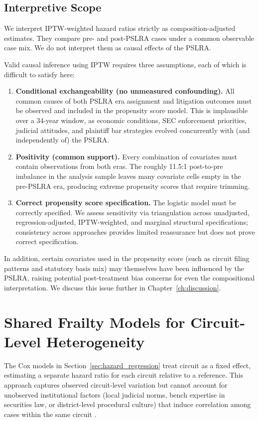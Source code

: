 \subsection{Interpretive Scope}

We interpret IPTW-weighted hazard ratios strictly as composition-adjusted estimates. They compare pre- and post-PSLRA cases under a common observable case mix. We do not interpret them as causal effects of the PSLRA.

Valid causal inference using IPTW requires three assumptions, each of which is difficult to satisfy here:
\begin{enumerate}
    \item \textbf{Conditional exchangeability (no unmeasured
    confounding).} All common causes of both PSLRA era assignment and litigation outcomes must be observed and included in the propensity score model. This is implausible over a
    34-year window, as economic conditions, SEC enforcement
    priorities, judicial attitudes, and plaintiff bar
    strategies evolved concurrently with (and independently
    of) the PSLRA.
    \item \textbf{Positivity (common support).} Every
    combination of covariates must contain observations from
    both eras. The roughly 11.5:1 post-to-pre imbalance in
    the analysis sample leaves many covariate cells empty in the pre-PSLRA era, producing extreme propensity scores that require trimming.
    \item \textbf{Correct propensity score specification.}
    The logistic model must be correctly specified. We assess
    sensitivity via triangulation across unadjusted,
    regression-adjusted, IPTW-weighted, and marginal
    structural specifications; consistency across approaches
    provides limited reassurance but does not prove correct
    specification.
\end{enumerate}
In addition, certain covariates used in the propensity score
(such as circuit filing patterns and statutory basis mix) may
themselves have been influenced by the PSLRA, raising
potential post-treatment bias concerns for even the
compositional interpretation. We discuss this issue further
in Chapter~\ref{ch:discussion}.

\section{Shared Frailty Models for Circuit-Level Heterogeneity}
\label{sec:frailty_method}

The Cox models in Section~\ref{sec:hazard_regression} treat circuit as a fixed effect,
estimating a separate hazard ratio for each circuit relative
to a reference. This approach captures observed
circuit-level variation but cannot account for unobserved
institutional factors (local judicial norms, bench expertise
in securities law, or district-level procedural culture) that
induce correlation among cases within the same circuit
\citep{ruetenbudde2019}.

